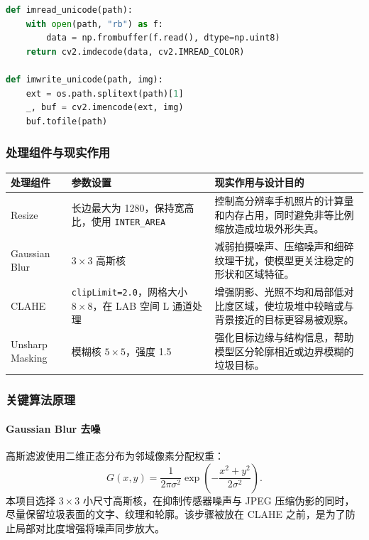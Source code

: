 \documentclass[UTF8,a4paper,12pt]{ctexart}
\begin{document}
\begin{lstlisting}[language=Python,caption={中文路径兼容与批量目录处理}]
def imread_unicode(path):
    with open(path, "rb") as f:
        data = np.frombuffer(f.read(), dtype=np.uint8)
    return cv2.imdecode(data, cv2.IMREAD_COLOR)

def imwrite_unicode(path, img):
    ext = os.path.splitext(path)[1]
    _, buf = cv2.imencode(ext, img)
    buf.tofile(path)
\end{lstlisting}

\subsubsection{处理组件与现实作用}

\begin{longtable}{p{3.1cm}p{4.2cm}p{7.0cm}}
  \toprule
  处理组件 & 参数设置 & 现实作用与设计目的 \\
  \midrule
  \endhead
  Resize & 长边最大为 1280，保持宽高比，使用 \texttt{INTER\_AREA} & 控制高分辨率手机照片的计算量和内存占用，同时避免非等比例缩放造成垃圾外形失真。\\
  Gaussian Blur & $3\times3$ 高斯核 & 减弱拍摄噪声、压缩噪声和细碎纹理干扰，使模型更关注稳定的形状和区域特征。\\
  CLAHE & \texttt{clipLimit=2.0}，网格大小 $8\times8$，在 LAB 空间 L 通道处理 & 增强阴影、光照不均和局部低对比度区域，使垃圾堆中较暗或与背景接近的目标更容易被观察。\\
  Unsharp Masking & 模糊核 $5\times5$，强度 1.5 & 强化目标边缘与结构信息，帮助模型区分轮廓相近或边界模糊的垃圾目标。\\
  \bottomrule
\end{longtable}

\subsubsection{关键算法原理}

\paragraph{Gaussian Blur 去噪}
高斯滤波使用二维正态分布为邻域像素分配权重：
\begin{equation}
  G(x,y)=\frac{1}{2\pi\sigma^2}
  \exp\left(-\frac{x^2+y^2}{2\sigma^2}\right).
\end{equation}
本项目选择 $3\times3$ 小尺寸高斯核，在抑制传感器噪声与 JPEG 压缩伪影的同时，尽量保留垃圾表面的文字、纹理和轮廓。该步骤被放在 CLAHE 之前，是为了防止局部对比度增强将噪声同步放大。
\end{document}
